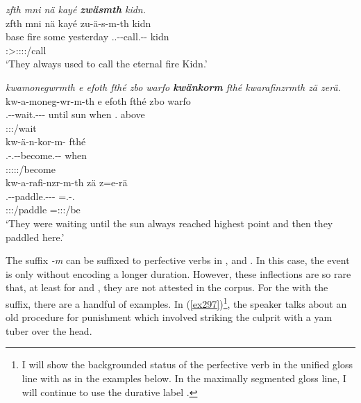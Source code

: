 \begin{exe}
	\ex \emph{zfth mni nä kayé \textbf{zwäsmth} kidn.}\\
	\glll zfth mni nä kayé zu-ä-s-m-th kidn\\
	base fire some yesterday \Tsg.\F.\Betaone-\Ndu-call.\Rs-\Dur-\Stnsg{} kidn\\
	{} {} {} {} \footnotesize{\Stpl:\Sbj>\Tsg:\Obj:\Pst:\Iter:\Dur/call} {}\\
	\trans `They always used to call the eternal fire Kidn.'
	\label{ex295}
\end{exe}
\begin{exe}
	\ex \emph{kwamonegwrmth e efoth fthé zbo warfo \textbf{kwänkorm} fthé kwarafinzrmth zä zerä.}\\
	\glll kw-a-moneg-wr-m-th e efoth fthé zbo warfo\\
	\M.\Betaone-\Vc-wait.\Ext-\Ndu-\Dur-\Stnsg{} until sun when \Prox.\All{} above\\
	\footnotesize{\Stpl:\Sbj:\Pst:\Dur/wait} {} {} {} {} {}\\
	\sn
	\glll kw-ä-n-kor-m-\Zero{} fthé\\
	\M.\Betaone-\Vc.\Ndu-\Venit-become.\Rs-\Dur-\Stsg{} when\\
	\footnotesize{\Stsg:\Sbj:\Pst:\Iter:\Dur:\Venit/become} {}\\
	\sn
	\glll kw-a-rafi-nzr-m-th zä z=e-rä\\
	\M.\Betaone-\Vc-paddle.\Ext-\Ndu-\Dur-\Stnsg{} \Prox{} \Prox=\Stnsg.\Alph-\Cop.\Ndu{}\\
	\footnotesize{\Stpl:\Sbj:\Pst:\Dur/paddle} {} \footnotesize{\Prox=\Stpl:\Sbj:\Nonpast:\Ipfv/be}\\
	\trans `They were waiting until the sun always reached highest point and then they paddled here.'
	\label{ex296}
\end{exe}

The  suffix \emph{-m} can be suffixed to perfective verbs in ,  and . In this case, the event is only  without encoding a longer duration. However, these inflections are so rare that, at least for  and , they are not attested in the corpus. For the   with the  suffix, there are a handful of examples. In (\ref{ex297})\footnote{I will show the backgrounded status of the perfective verb in the unified gloss line with \Bg{} as in the examples below. In the maximally segmented gloss line, I will continue to use the durative label \Dur{}.}, the speaker talks about an old procedure for punishment which involved striking the culprit with a yam tuber over the head.

